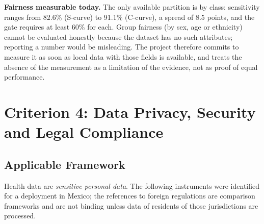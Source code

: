 \documentclass[12pt,a4paper]{article}
\begin{document}
\noindent\textbf{Fairness measurable today.} The only available partition is by class: sensitivity ranges from 82.6\% (S-curve) to 91.1\% (C-curve), a spread of 8.5 points, and the gate requires at least 60\% for each.
Group fairness (by sex, age or ethnicity) cannot be evaluated honestly because the dataset has no such attributes; reporting a number would be misleading. The project therefore commits to measure it as soon as local data with those fields
is available, and treats the absence of the measurement as a limitation of the evidence, not as proof of equal performance.

\section{Criterion 4: Data Privacy, Security and Legal Compliance}
\label{sec:m4c4}

\subsection{Applicable Framework}

Health data are \emph{sensitive personal data}. The following instruments were identified for a deployment in Mexico; the references to foreign regulations are comparison frameworks and are
not binding unless data of residents of those jurisdictions are processed.
\end{document}
